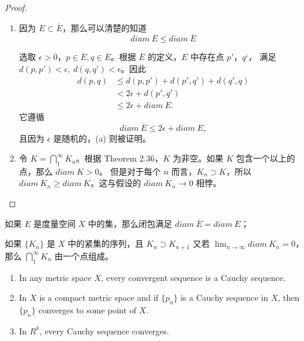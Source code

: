 \documentclass[../poma-notes.tex]{subfiles}
\begin{document}
\begin{proof}
  \begin{enumerate}[label=(\alph*)]
    \item 因为 $E \subset \overline{E}$，那么可以清楚的知道
          \[diam\ E \le diam\ \overline{E}\]

          选取 $\epsilon > 0$，$p \in \overline{E}, q \in \overline{E}$。根据 $\overline{E}$ 的定义，$E$ 中存在点 $p'$，$q‘$，
          满足 $d(p,p') < \epsilon,\ d(q,q') < \epsilon$。因此
          \begin{align*}
            \mathcal{} d(p,q) & \le d(p,p') + d(p',q') + d(q',q) \\
                              & < 2\epsilon + d(p',q')           \\
                              & \le 2\epsilon + diam\ E.
          \end{align*}
          它遵循
          \[diam\ \overline{E} \le 2\epsilon + diam\ E,\]
          且因为 $\epsilon$ 是随机的，(a) 则被证明。
    \item 令 $K = \bigcap_1^{\infty} K_n$。根据 Theorem 2.36，$K$ 为非空。如果 $K$ 包含一个以上的点，那么 $diam\ K > 0$。
          但是对于每个 $n$ 而言，$K_n \supset K$，所以 $diam\ K_n \ge diam\ K$。这与假设的 $diam\ K_n \to 0$ 相悖。
  \end{enumerate}
\end{proof}

\begin{anote}
  \begin{enumerate*}[label=(\alph*)]
    \item 如果 $E$ 是度量空间 $X$ 中的集，那么闭包满足 $diam\ \overline{E} = diam\ E$；
    \item 如果 $\{K_n\}$ 是 $X$ 中的紧集的序列，且 $K_n \supset K_{n+1}$ 又若 $\lim_{n \to \infty} diam\ K_n = 0$，
          那么 $\bigcap_1^{\infty} K_n$ 由一个点组成。
  \end{enumerate*}
\end{anote}

\begin{theorem}\mbox{}
  \begin{enumerate}
    \item In any metric space $X$, every convergent sequence is a Cauchy sequence.
    \item In $X$ is a compact metric space and if $\{p_n\}$ is a Cauchy sequence in $X$, then $\{p_n\}$ converges to
          some point of $X$.
    \item In $R^k$, every Cauchy sequence converges.
  \end{enumerate}
\end{theorem}
\end{document}
